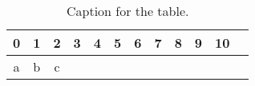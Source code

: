 \documentclass{article}
\begin{document}
\begin{table}[h!]
  \begin{center}
    \caption{Caption for the table.}
    \label{tab:table1}
    \begin{tabular}{||cl|c||c||c||c||c||c||c||c||c||c||}
      0 & 1 & 2 & 3 & 4 & 5 & 6 & 7 & 8 & 9 & 10\\
      \hline
      a & b & c\\
    \end{tabular}
  \end{center}
\end{table}
\end{document}

